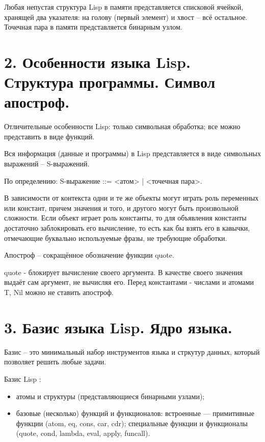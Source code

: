 \documentclass[12pt]{report}
\begin{document}
Любая непустая структура Lisp в памяти представляется списковой ячейкой, хранящей два указателя: на голову (первый элемент) и хвост – всё остальное. Точечная пара в памяти представляется бинарным узлом.

\section*{2.	Особенности языка Lisp. Структура программы. Символ апостроф.}

Отличительные особенности Lisp: только символьная обработка; все можно представить в виде функций.
	
Вся информация (данные и программы) в Lisp представляется в виде символьных выражений – S-выражений. 

По определению: S-выражение ::= <атом> | <точечная пара>.
	
В зависимости от контекста одни и те же объекты могут играть роль переменных или констант, причем значения и того, и другого могут быть произвольной сложности. Если объект играет роль константы, то для объявления константы достаточно заблокировать его вычисление, то есть как бы взять его в кавычки, отмечающие буквально используемые фразы, не требующие обработки. 

Апостроф – сокращённое обозначение функции quote.

quote - блокирует вычисление своего аргумента. В качестве своего значения выдаёт сам аргумент, не вычисляя его. Перед константами - числами и атомами T, Nil можно не ставить апостроф.




\section*{3.	Базис языка Lisp. Ядро языка.}
Базис -- это минимальный набор инструментов языка и стркутур данных, который позволяет решить любые задачи.


Базис Lisp :

\begin{itemize}
	\item атомы и структуры (представляющиеся бинарными узлами);
	\item базовые (несколько) функций и функционалов: встроенные — примитивные 
	функции (atom, eq, cons, car, cdr); специальные функции и функционалы (quote, 
	cond, lambda, eval, apply, funcall).

\end{itemize}
	
\end{document}
